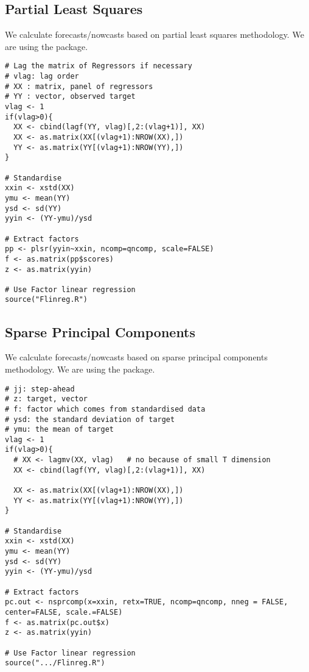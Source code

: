 \documentclass[12pt]{article}
\begin{document}
\subsection{Partial Least Squares \textendash{} {\href{https://github.com/eurostat/econowcast/blob/master/nowcast/pls.R}{}}}

We calculate forecasts/nowcasts based on partial least squares methodology. We
are using the  package.

\begin{lstlisting}[title=\textbf{Factor Linear regression.}]
# Lag the matrix of Regressors if necessary
# vlag: lag order
# XX : matrix, panel of regressors
# YY : vector, observed target
vlag <- 1
if(vlag>0){
  XX <- cbind(lagf(YY, vlag)[,2:(vlag+1)], XX)
  XX <- as.matrix(XX[(vlag+1):NROW(XX),])
  YY <- as.matrix(YY[(vlag+1):NROW(YY),])
}

# Standardise
xxin <- xstd(XX)
ymu <- mean(YY)
ysd <- sd(YY)
yyin <- (YY-ymu)/ysd

# Extract factors
pp <- plsr(yyin~xxin, ncomp=qncomp, scale=FALSE)
f <- as.matrix(pp$scores)
z <- as.matrix(yyin)

# Use Factor linear regression
source("Flinreg.R")
\end{lstlisting}

\subsection{Sparse Principal Components \textendash{} {\href{https://github.com/eurostat/econowcast/blob/master/nowcast/spc.R}{}}}

We calculate forecasts/nowcasts based on sparse principal components
methodology. We are using the  package.

\begin{lstlisting}[title=\textbf{Sparse Principal Components.}]
# jj: step-ahead
# z: target, vector
# f: factor which comes from standardised data
# ysd: the standard deviation of target
# ymu: the mean of target
vlag <- 1
if(vlag>0){
  # XX <- lagmv(XX, vlag)   # no because of small T dimension
  XX <- cbind(lagf(YY, vlag)[,2:(vlag+1)], XX)

  XX <- as.matrix(XX[(vlag+1):NROW(XX),])
  YY <- as.matrix(YY[(vlag+1):NROW(YY),])
}

# Standardise
xxin <- xstd(XX)
ymu <- mean(YY)
ysd <- sd(YY)
yyin <- (YY-ymu)/ysd

# Extract factors
pc.out <- nsprcomp(x=xxin, retx=TRUE, ncomp=qncomp, nneg = FALSE, center=FALSE, scale.=FALSE)
f <- as.matrix(pc.out$x)
z <- as.matrix(yyin)

# Use Factor linear regression
source(".../Flinreg.R")
\end{lstlisting}
\end{document}
